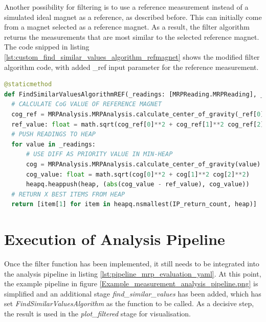 Another possibility for filtering is to use a reference measurement
instead of a simulated ideal magnet as a reference, as described before.
This can initially come from a magnet selected as a reference magnet. As
a result, the filter algorithm returns the measurements that are most
similar to the selected reference magnet. The code snipped in listing
\ref{lst:custom_find_similar_values_algorithm_refmagnet} shows the
modified filter algorithm code, with added \_ref input parameter for the
reference measurement.

\newpage

\begin{lstlisting}[language=Python, caption={Modified user implemented custom find algorithm using a reference magnet reading}, label=lst:custom_find_similar_values_algorithm_refmagnet]
@staticmethod
def FindSimilarValuesAlgorithmREF(_readings: [MRPReading.MRPReading], _ref: [MRPReading.MRPReading], IP_return_count: int = 4) -> [MRPReading.MRPReading]:
  # CALCULATE CoG VALUE OF REFERENCE MAGNET
  cog_ref = MRPAnalysis.MRPAnalysis.calculate_center_of_gravity(_ref[0])
  ref_value: float = math.sqrt(cog_ref[0]**2 + cog_ref[1]**2 cog_ref[2]**2)
  # PUSH READINGS TO HEAP
  for value in _readings:
      # USE DIFF AS PRIORITY VALUE IN MIN-HEAP
      cog = MRPAnalysis.MRPAnalysis.calculate_center_of_gravity(value)
      cog_value: float = math.sqrt(cog[0]**2 + cog[1]**2 cog[2]**2)
      heapq.heappush(heap, (abs(cog_value - ref_value), cog_value))
  # RETURN X BEST ITEMS FROM HEAP
  return [item[1] for item in heapq.nsmallest(IP_return_count, heap)]
\end{lstlisting}

\hypertarget{execution-of-analysis-pipeline}{%
\section{Execution of Analysis
Pipeline}\label{execution-of-analysis-pipeline}}

Once the filter function has been implemented, it still needs to be
integrated into the analysis pipeline in listing
\ref{lst:pipeline_mrp_evaluation_yaml}. At this point, the example
pipeline in figure \ref{Example_measurement_analysis_pipeline.png} is
simplified and an additional stage \emph{find\_similar\_values} has been
added, which has set \emph{FindSimilarValuesAlgorithm} as the function
to be called. As a decisive step, the result is used in the
\emph{plot\_filtered} stage for visualisation.

